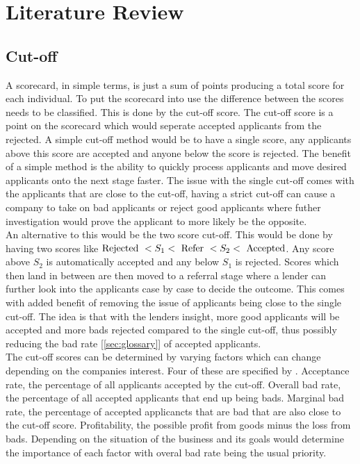 \chapter{Literature Review}\label{chapter:2}

\section{Cut-off}

A scorecard, in simple terms, is just a sum of points producing a total score for each individual. To put the scorecard into use the difference between the scores needs to be classified. This is done by the cut-off score. The cut-off score is a point on the scorecard which would seperate accepted applicants from the rejected. A simple cut-off method would be to have a single score, any applicants above this score are accepted and anyone below the score is rejected. The benefit of a simple method is the ability to quickly process applicants and move desired applicants onto the next stage faster. The issue with the single cut-off comes with the applicants that are close to the cut-off, having a strict cut-off can cause a company to take on bad applicants or reject good applicants where futher investigation would prove the applicant to more likely be the opposite. \\

An alternative to this would be the two score cut-off. This would be done by having two scores like $ \textup{Rejected } < S_{1} < \textup{ Refer } < S_{2} < \textup{ Accepted}$. Any score above $S_{2}$ is automatically accepted and any below $S_{1}$ is rejected. Scores which then land in between are then moved to a referral stage where a lender can further look into the applicants case by case to decide the outcome. This comes with added benefit of removing the issue of applicants being close to the single cut-off. The idea is that with the lenders insight, more good applicants will be accepted and more bads rejected compared to the single cut-off, thus possibly reducing the bad rate [\ref{sec:glossary}] of accepted applicants. \\

The cut-off scores can be determined by varying factors which can change depending on the companies interest. Four of these are specified by \parencite{bailey2004credit}. Acceptance rate, the percentage of all applicants accepted by the cut-off. Overall bad rate, the percentage of all accepted applicants that end up being bads. Marginal bad rate, the percentage of accepted applicancts that are bad that are also close to the cut-off score. Profitability, the possible profit from goods minus the loss from bads. Depending on the situation of the business and its goals would determine the importance of each factor with overal bad rate being the usual priority.

